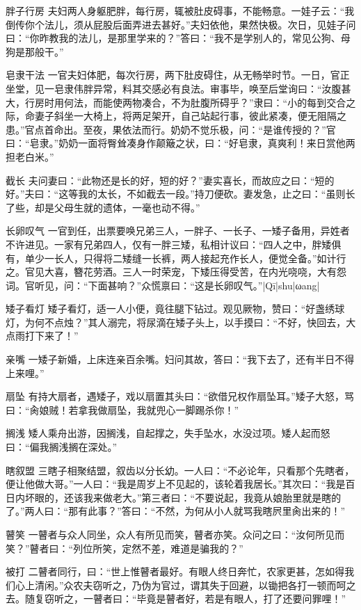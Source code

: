 \documentclass[12pt,UTF8]{ctexbook}
\begin{document}
胖子行房
夫妇两人身躯肥胖，每行房，辄被肚皮碍事，不能畅意。一娃子云：“我倒传你个法儿，须从屁股后面弄进去甚好。”夫妇依他，果然快极。次日，见娃子问曰：“你昨教我的法儿，是那里学来的？”答曰：“我不是学别人的，常见公狗、母狗是那般干。”

皂隶干法
一官夫妇体肥，每次行房，两下肚皮碍住，从无畅举时节。一日，官正坐堂，见一皂隶伟胖异常，料其交感必有良法。审事毕，唤至后堂询曰：“汝腹甚大，行房时用何法，而能使两物凑合，不为肚腹所碍乎？”隶曰：“小的每到交合之际，命妻子斜坐一大椅上，将两足架开，自己站起行事，彼此紧凑，便无阻隔之患。”官点首命出。至夜，果依法而行。奶奶不觉乐极，问：“是谁传授的？”官曰：“皂隶。”奶奶一面将臀耸凑身作颠簸之状，曰：“好皂隶，真爽利！来日赏他两担老白米。”

截长
夫问妻曰：“此物还是长的好，短的好？”妻实喜长，而故应之曰：“短的好。”夫曰：“这等我的太长，不如截去一段。”持刀便砍。妻发急，止之曰：“虽则长了些，却是父母生就的遗体，一毫也动不得。”

长卵叹气
一官到任，出票要唤兄弟三人，一胖子、一长子、一矮子备用，异姓者不许进见。一家有兄弟四人，仅有一胖三矮，私相计议曰：“四人之中，胖矮俱有，单少一长人，只得将二矮缝一长裤，两人接起充作长人，便觉全备。”如计行之。官见大喜，簪花劳酒。三人一时荣宠，下矮压得受苦，在内光哓哓，大有怨词。官听见，问：“下面甚响？”众慌禀曰：“这是长卵叹气。”|Qī|shu|ωang|

矮子看灯
矮子看灯，适一人小便，竟往腿下钻过。观见厥物，赞曰：“好盏绣球灯，为何不点烛？”其人溺完，将尿滴在矮子头上，以手摸曰：“不好，快回去，大点雨打下来了！”

亲嘴
一矮子新婚，上床连亲百余嘴。妇问其故，答曰：“我下去了，还有半日不得上来哩。”

扇坠
有持大扇者，遇矮子，戏以扇置其头曰：“欲借兄权作扇坠耳。”矮子大怒，骂曰：“肏娘贼！若拿我做扇坠，我就兜心一脚踢杀你！”

搁浅
矮人乘舟出游，因搁浅，自起撑之，失手坠水，水没过项。矮人起而怒曰：“偏我搁浅搁在深处。”

瞎叙盟
三瞎子相聚结盟，叙齿以分长幼。一人曰：“不必论年，只看那个先瞎者，便让他做大哥。”一人曰：“我是周岁上不见起的，该轮着我居长。”其次曰：“我是百日内坏眼的，还该我来做老大。”第三者曰：“不要说起，我竟从娘胎里就是瞎的了。”两人曰：“那有此事？”答曰：“不然，为何从小人就骂我瞎屄里肏出来的！”

瞽笑
一瞽者与众人同坐，众人有所见而笑，瞽者亦笑。众问之曰：“汝何所见而笑？”瞽者曰：“列位所笑，定然不差，难道是骗我的？”

被打
二瞽者同行，曰：“世上惟瞽者最好。有眼人终日奔忙，农家更甚，怎如得我们心上清闲。”众农夫窃听之，乃伪为官过，谓其失于回避，以锄把各打一顿而呵之去。随复窃听之，一瞽者曰：“毕竟是瞽者好，若是有眼人，打了还要问罪哩！”
\end{document}
